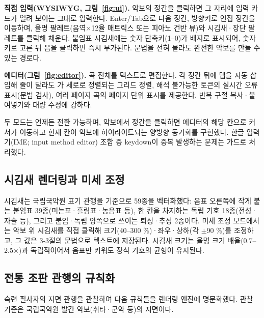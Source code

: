 \textbf{직접 입력(WYSIWYG, 그림~\ref{fig:ui}).} 악보의 정간을 클릭하면
그 자리에 입력 카드가 열려 보이는 그대로 입력한다. Enter/Tab으로 다음 정간, 방향키로 인접 정간을
이동하며, 율명 팔레트(음역$\times$12율 매트릭스 또는 피아노 건반 뷰)와
시김새·장단 팔레트를 클릭해 채운다. 붙임표 시김새에는 숫자 단축키(1--0)가
배지로 표시되어, 숫자키로 고른 뒤 음을 클릭하면 즉시 부가된다.
문법을 전혀 몰라도 완전한 악보를 만들 수 있는 경로다.

\textbf{에디터(그림~\ref{fig:editor}).} 곡 전체를 텍스트로 편집한다.
각 정간 뒤에 탭을 자동 삽입해 줄이 달라도 \code{|}가 세로로 정렬되는
그리드 정렬, 해석 불가능한
토큰의 실시간 오류 표시(문법 검사), 여러 페이지 곡의 페이지 단위 표시를
제공한다. 반복 구절 복사·붙여넣기와 대량 수정에 강하다.

두 모드는 언제든 전환 가능하며, 악보에서 정간을 클릭하면 에디터의 해당
칸으로 커서가 이동하고 현재 칸이 악보에 하이라이트되는 양방향 동기화를
구현했다. 한글 입력기(IME; input method editor) 조합 중 keydown이
중복 발생하는 문제는
 가드로 처리했다.

\subsection{시김새 렌더링과 미세 조정}

시김새는 국립국악원 표기 관행을 기준으로 59종을 벡터화했다:
음표 오른쪽에 작게 붙는 붙임표 39종(미는표·흘림표·농음표 등),
한 칸을 차지하는 독립 기호 18종(전성·자출 등), 그리고 붙임·독립 양쪽으로
쓰이는 퇴성·추성 2종이다. 미세 조정 모드에서는 악보 위 시김새를 직접
클릭해 크기(40--300 \%)·좌우·상하(각 $\pm$90 \%)를 조정하고, 그 값은 3-3절의
문법으로 텍스트에 저장된다. 시김새 크기는 율명 크기 배율(0.7--2.5$\times$)과
독립적이어서 음표만 키워도 장식 기호의 균형이 유지된다.

\subsection{전통 조판 관행의 규칙화}

숙련 필사자의 지면 관행을 관찰하여 다음 규칙들을 렌더링 엔진에 명문화했다.
관찰 기준은 국립국악원 발간 악보(취타·군악 등)의 지면이다.

